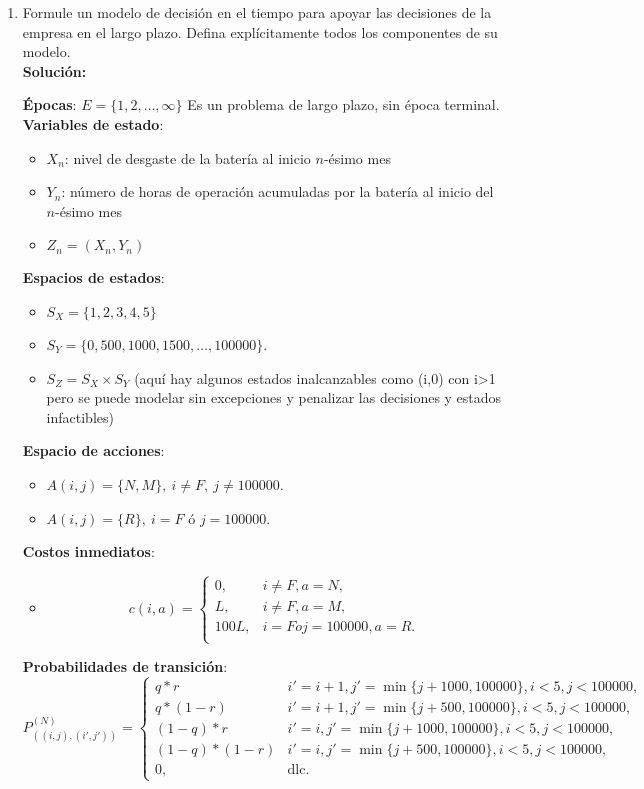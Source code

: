 \begin{enumerate}
\item Formule un modelo de decisión en el tiempo para apoyar las decisiones de la empresa en el largo plazo. 
Defina explícitamente todos los componentes de su modelo. \\ 

\noindent\textbf{Solución:}

\textbf{Épocas}: $E=\{1,2,\dots, \infty\}$
	Es un problema de largo plazo, sin época terminal. \\
\textbf{Variables de estado}:
\begin{itemize}
	\item[] $X_n$: nivel de desgaste de la batería al inicio $n$-ésimo mes
		\item[] $Y_n$: número de horas de operación acumuladas por la batería al inicio del $n$-ésimo mes
		\item[] $Z_n = (X_n,Y_n)$
\end{itemize}
\textbf{Espacios de estados}:
\begin{itemize}
    \item $S_X = \{1, 2, 3, 4, 5\}$ 
    \item $S_Y = \{0, 500, 1000, 1500, \dots, 100000\}$. 
    \item $S_Z = S_X \times S_Y$ (aquí hay algunos estados inalcanzables como (i,0) con i>1 pero se puede modelar sin excepciones y penalizar las decisiones y estados infactibles)
\end{itemize}
\textbf{Espacio de acciones}:
\begin{itemize}
    \item[] $A(i,j) = \{N,M\},\ i \neq F,\ j\neq 100000$. 
    \item[] $A(i,j) = \{R\},\ i = F \text{ ó } j = 100000$.
\end{itemize}
	
\textbf{Costos inmediatos}:
\begin{itemize}
    \item[] \[c(i,a) = 
		\begin{cases}
		0,							& i\neq F, a = N, \\ 
		L, 							& i\neq F, a = M, \\ 
		100L,  					& i=F o j=100000, a = R. \\ 
		\end{cases} \]
\end{itemize}

\textbf{Probabilidades de transición}:
    \[P_{((i,j),(i',j'))}^{(N)} = 
		\begin{cases}
		q*r							&	i' = i + 1, j' = \min\{j + 1000, 100000\}, i < 5, j < 100000,\\
		q*(1-r)					&	i' = i + 1, j' = \min\{j + 500, 100000\},  i < 5, j < 100000, \\
		(1-q)*r					&	i' = i,     j' = \min\{j + 1000, 100000\}, i < 5, j < 100000,\\
		(1-q)*(1-r)			&	i' = i,     j' = \min\{j + 500, 100000\},  i < 5, j < 100000, \\
		0,							& \text{dlc}.  
		\end{cases} \]


\end{enumerate}
